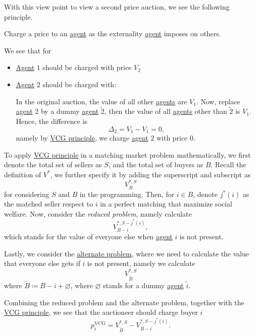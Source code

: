 With this view point to view a second price auction, we see the following principle.
\begin{theorem}\label{thm:VCG}
	Charge a price to an \hyperref[def:player]{agent} as the externality \hyperref[def:player]{agent} imposes on others.
\end{theorem}
\begin{eg}
	We see that for
	\begin{itemize}
		\item \hyperref[def:player]{Agent} \(1\) should be charged with price \(V_2\)
		\item \hyperref[def:player]{Agent} \(2\) should be charged with:
		      \par In the original auction, the value of all other \hyperref[def:player]{agents} are \(V_{1}\). Now, replace \hyperref[def:player]{agent}
		      \(2\) by a dummy \hyperref[def:player]{agent} \(\tilde{2}\), then the value of all \hyperref[def:player]{agents} other
		      than \(\tilde{2}\) is \(V_{1}\). Hence, the difference is
		      \[
			      \Delta_{2} = V_{1} - V_{1} = 0,
		      \]
		      namely by \hyperref[thm:VCG]{VCG principle}, we charge \hyperref[def:player]{agent} \(2\) with price \(0\).
	\end{itemize}
\end{eg}

To apply \hyperref[thm:VCG]{VCG principle} in a matching market problem mathematically, we first denote the total set of sellers as \(S\), and the total
set of buyers as \(B\). Recall the definition of \(V^{\ast}\), we further specify it by adding the superscript and subscript as
\[
	V^{*, S}_{B}
\]
for considering \(S\) and \(B\) in the programming. Then, for \(i\in B\), denote \(j^{\ast} (i)\) as the matched seller respect to \(i\) in a perfect matching that
maximize social welfare. Now, consider the \emph{reduced problem}, namely calculate
\[
	V^{*, S-j^{\ast}(i)}_{B-i},
\]
which stands for the value of everyone else when \hyperref[def:player]{agent} \(i\) is not present.

Lastly, we consider the \underline{alternate problem}, where we need to calculate the value that everyone else gets if \(i\) is not present, namely we
calculate
\[
	V^{*, S}_{\widetilde{B}}
\]
where \(\widetilde{B} \coloneqq B - i + \varnothing \), where \(\varnothing \) stands for a dummy \hyperref[def:player]{agent} \(\widetilde{i} \).

Combining the reduced problem and the alternate problem, together with the \hyperref[thm:VCG]{VCG principle}, we see that the auctioneer should charge buyer \(i\)
\[
	p_{i}^\mathrm{VCG} = V_{\widetilde{B} }^{*, S} - V_{B-i}^{\ast, S-j^{\ast} (i)}.
\]

